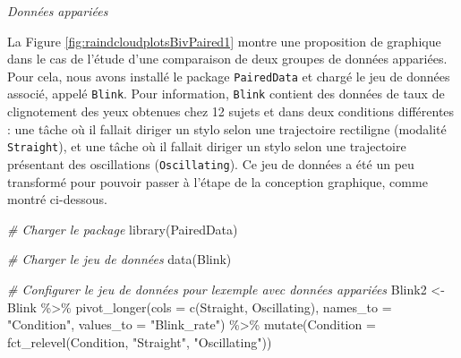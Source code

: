 \documentclass[
]{book}
\newenvironment{Shaded}{\begin{snugshade}}{\end{snugshade}}
\newcommand{\AttributeTok}[1]{\textcolor[rgb]{0.77,0.63,0.00}{#1}}
\newcommand{\CommentTok}[1]{\textcolor[rgb]{0.56,0.35,0.01}{\textit{#1}}}
\newcommand{\FunctionTok}[1]{\textcolor[rgb]{0.00,0.00,0.00}{#1}}
\newcommand{\NormalTok}[1]{#1}
\newcommand{\OtherTok}[1]{\textcolor[rgb]{0.56,0.35,0.01}{#1}}
\newcommand{\SpecialCharTok}[1]{\textcolor[rgb]{0.00,0.00,0.00}{#1}}
\newcommand{\StringTok}[1]{\textcolor[rgb]{0.31,0.60,0.02}{#1}}
\begin{document}
\emph{Données appariées}

La Figure \ref{fig:raindcloudplotsBivPaired1} montre une proposition de graphique dans le cas de l'étude d'une comparaison de deux groupes de données appariées. Pour cela, nous avons installé le package \texttt{PairedData} et chargé le jeu de données associé, appelé \texttt{Blink}. Pour information, \texttt{Blink} contient des données de taux de clignotement des yeux obtenues chez 12 sujets et dans deux conditions différentes : une tâche où il fallait diriger un stylo selon une trajectoire rectiligne (modalité \texttt{Straight}), et une tâche où il fallait diriger un stylo selon une trajectoire présentant des oscillations (\texttt{Oscillating}). Ce jeu de données a été un peu transformé pour pouvoir passer à l'étape de la conception graphique, comme montré ci-dessous.

\begin{Shaded}
\begin{Highlighting}[]
\CommentTok{\# Charger le package}
\FunctionTok{library}\NormalTok{(PairedData)}

\CommentTok{\# Charger le jeu de données}
\FunctionTok{data}\NormalTok{(Blink)}

\CommentTok{\# Configurer le jeu de données pour l\textquotesingle{}exemple avec données appariées}
\NormalTok{Blink2 }\OtherTok{\textless{}{-}}
\NormalTok{  Blink }\SpecialCharTok{\%\textgreater{}\%}
  \FunctionTok{pivot\_longer}\NormalTok{(}\AttributeTok{cols =} \FunctionTok{c}\NormalTok{(Straight, Oscillating), }
               \AttributeTok{names\_to =} \StringTok{"Condition"}\NormalTok{, }
               \AttributeTok{values\_to =} \StringTok{"Blink\_rate"}\NormalTok{) }\SpecialCharTok{\%\textgreater{}\%}
  \FunctionTok{mutate}\NormalTok{(}\AttributeTok{Condition =} \FunctionTok{fct\_relevel}\NormalTok{(Condition, }\StringTok{"Straight"}\NormalTok{, }\StringTok{"Oscillating"}\NormalTok{))}
\end{Highlighting}
\end{Shaded}
\end{document}
